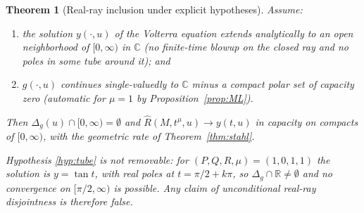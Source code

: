\documentclass[11pt]{article}
\newtheorem{theorem}{Theorem}[section]
\theoremstyle{definition}
\begin{document}
\begin{theorem}[Real-ray inclusion under explicit hypotheses]\label{thm:realray}
Assume:
\begin{enumerate}[label=(H\arabic*),leftmargin=*]
  \item\label{hyp:tube} the solution $y(\cdot,u)$ of the Volterra
        equation extends analytically to an open neighborhood of
        $[0,\infty)$ in $\mathbb{C}$ (no finite-time blowup on the
        closed ray and no poles in some tube around it); and
  \item\label{hyp:single} $g(\cdot,u)$ continues single-valuedly to
        $\mathbb{C}$ minus a compact polar set of capacity zero
        (automatic for $\mu = 1$ by Proposition~\ref{prop:ML}).
\end{enumerate}
Then $\Delta_{g}(u) \cap [0,\infty) = \emptyset$ and
$\hat R(M, t^{\mu}, u) \to y(t,u)$ in capacity on compacts of
$[0,\infty)$, with the geometric rate of Theorem~\ref{thm:stahl}.

Hypothesis \ref{hyp:tube} is \emph{not removable}: for
$(P,Q,R,\mu) = (1,0,1,1)$ the solution is $y = \tan t$, with real
poles at $t = \pi/2 + k\pi$, so $\Delta_{g} \cap \mathbb{R} \neq
\emptyset$ and no convergence on $[\pi/2,\infty)$ is possible. Any
claim of unconditional real-ray disjointness is therefore false.
\end{theorem}
\end{document}
